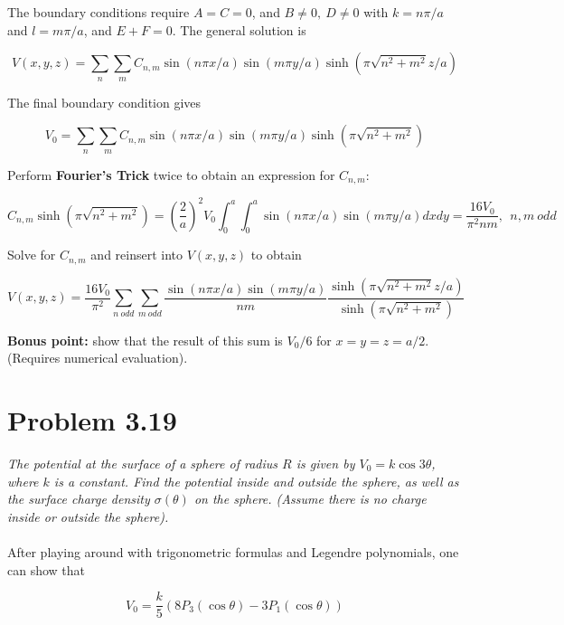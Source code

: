 \documentclass[10pt]{article}
\begin{document}
The boundary conditions require $A = C = 0$, and $B\neq 0, ~ D\neq 0$ with $k=n\pi/a$ and $l=m\pi/a$, and $E + F = 0$.  The general solution is 

\begin{equation}
V(x,y,z) = \sum_{n} \sum_{m} C_{n,m} \sin(n\pi x/a)\sin(m\pi y/a)\sinh(\pi\sqrt{n^2+m^2}z/a)
\end{equation}

The final boundary condition gives

\begin{equation}
V_0 = \sum_{n} \sum_{m} C_{n,m} \sin(n\pi x/a)\sin(m\pi y/a)\sinh(\pi\sqrt{n^2+m^2})
\end{equation}

Perform \textbf{Fourier's Trick} twice to obtain an expression for $C_{n,m}$:

\begin{equation}
C_{n,m} \sinh(\pi\sqrt{n^2+m^2}) = \left(\frac{2}{a}\right)^2 V_0 \int_0^a\int_0^a \sin(n\pi x/a)\sin(m\pi y/a) dx dy = \frac{16 V_0}{\pi^2 n m}, ~~ n,m~ odd
\end{equation}

Solve for $C_{n,m}$ and reinsert into $V(x,y,z)$ to obtain

\begin{equation}
V(x,y,z) = \frac{16V_0}{\pi^2}\sum_{n~odd}\sum_{m~odd} \frac{\sin(n\pi x/a)\sin(m\pi y/a)}{nm}\frac{\sinh(\pi \sqrt{n^2 + m^2} z/a)}{\sinh(\pi \sqrt{n^2 + m^2})}
\end{equation}

\textbf{Bonus point:} show that the result of this sum is $V_0/6$ for $x = y = z = a/2$.  (Requires numerical evaluation).

\section{Problem 3.19}

\textit{The potential at the surface of a sphere of radius $R$ is given by $V_0 = k\cos 3\theta$, where $k$ is a constant.  Find the potential inside and outside the sphere, as well as the surface charge density $\sigma(\theta)$ on the sphere.  (Assume there is no charge inside or outside the sphere).} \\ \\

After playing around with trigonometric formulas and Legendre polynomials, one can show that

\begin{equation}
V_0 = \frac{k}{5}(8P_3(\cos\theta) - 3P_1(\cos\theta))
\end{equation}
\end{document}

